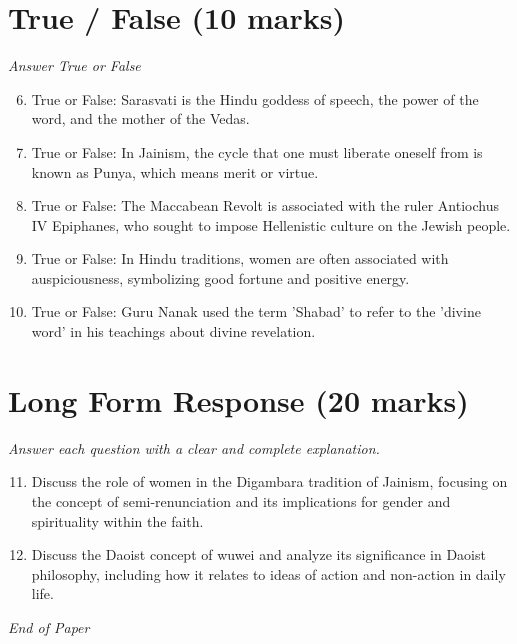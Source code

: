 \documentclass[12pt]{article}
\begin{document}
\section*{True / False (10 marks)}
\textit{Answer True or False}
\begin{enumerate}[label=\arabic*.]
\setcounter{enumi}{5}
\item True or False: Sarasvati is the Hindu goddess of speech, the power of the word, and the mother of the Vedas.
\item True or False: In Jainism, the cycle that one must liberate oneself from is known as Punya, which means merit or virtue.
\item True or False: The Maccabean Revolt is associated with the ruler Antiochus IV Epiphanes, who sought to impose Hellenistic culture on the Jewish people.
\item True or False: In Hindu traditions, women are often associated with auspiciousness, symbolizing good fortune and positive energy.
\item True or False: Guru Nanak used the term 'Shabad' to refer to the 'divine word' in his teachings about divine revelation.
\end{enumerate}

\section*{Long Form Response (20 marks)}
\textit{Answer each question with a clear and complete explanation.}
\begin{enumerate}[label=\arabic*.]
\setcounter{enumi}{10}
\item Discuss the role of women in the Digambara tradition of Jainism, focusing on the concept of semi-renunciation and its implications for gender and spirituality within the faith.
\item Discuss the Daoist concept of wuwei and analyze its significance in Daoist philosophy, including how it relates to ideas of action and non-action in daily life.
\end{enumerate}

\vfill
\noindent\textit{End of Paper}
\end{document}
